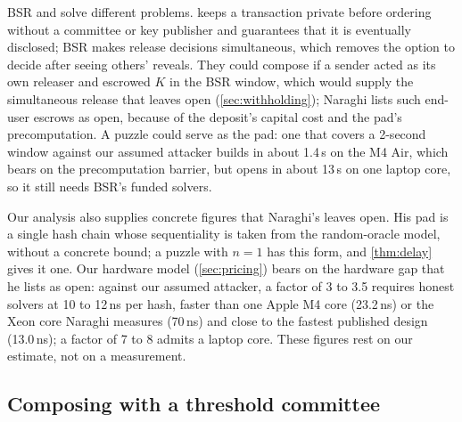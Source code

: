 BSR and \leanseal solve different problems. \leanseal keeps a transaction private before ordering without a committee or key publisher and guarantees that it is eventually disclosed; BSR makes release decisions simultaneous, which removes the option to decide after seeing others' reveals. They could compose if a \leanseal sender acted as its own releaser and escrowed $K$ in the BSR window, which would supply the simultaneous release that \leanseal leaves open (\cref{sec:withholding}); Naraghi lists such end-user escrows as open, because of the deposit's capital cost and the pad's precomputation. A \leanseal puzzle could serve as the pad: one that covers a 2-second window against our assumed attacker builds in about 1.4\,s on the M4 Air, which bears on the precomputation barrier, but opens in about 13\,s on one laptop core, so it still needs BSR's funded solvers.

Our analysis also supplies concrete figures that Naraghi's leaves open. His pad is a single hash chain whose sequentiality is taken from the random-oracle model, without a concrete bound; a \leanseal puzzle with $n = 1$ has this form, and \cref{thm:delay} gives it one. Our hardware model (\cref{sec:pricing}) bears on the hardware gap that he lists as open: against our assumed attacker, a factor of 3 to 3.5 requires honest solvers at 10 to 12\,ns per hash, faster than one Apple M4 core (23.2\,ns) or the Xeon core Naraghi measures (70\,ns) and close to the fastest published design (13.0\,ns); a factor of 7 to 8 admits a laptop core. These figures rest on our estimate, not on a measurement.

\subsection{Composing \leanseal with a threshold committee}\label{sec:composition}

